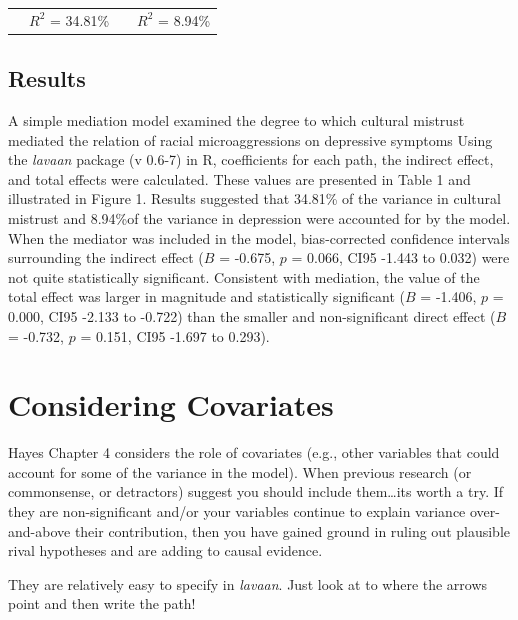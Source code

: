 \documentclass[
  english,
]{book}
\begin{document}
\begin{longtable}[]{@{}lccc@{}}
\toprule
& & & \\
\midrule
\endhead
& \(R^2\) = 34.81\% & & \(R^2\) = 8.94\% \\
\bottomrule
\end{longtable}

\hypertarget{results-3}{%
\subsection{Results}\label{results-3}}

A simple mediation model examined the degree to which cultural mistrust mediated the relation of racial microaggressions on depressive symptoms Using the \emph{lavaan} package (v 0.6-7) in R, coefficients for each path, the indirect effect, and total effects were calculated. These values are presented in Table 1 and illustrated in Figure 1. Results suggested that 34.81\% of the variance in cultural mistrust and 8.94\%of the variance in depression were accounted for by the model. When the mediator was included in the model, bias-corrected confidence intervals surrounding the indirect effect (\(B\) = -0.675, \(p\) = 0.066, CI95 -1.443 to 0.032) were not quite statistically significant. Consistent with mediation, the value of the total effect was larger in magnitude and statistically significant (\(B\) = -1.406, \(p\) = 0.000, CI95 -2.133 to -0.722) than the smaller and non-significant direct effect (\(B\) = -0.732, \(p\) = 0.151, CI95 -1.697 to 0.293).

\hypertarget{considering-covariates}{%
\section{Considering Covariates}\label{considering-covariates}}

Hayes Chapter 4 \citeyearpar{hayes_introduction_2018} considers the role of covariates (e.g., other variables that could account for some of the variance in the model). When previous research (or commonsense, or detractors) suggest you should include them\ldots its worth a try. If they are non-significant and/or your variables continue to explain variance over-and-above their contribution, then you have gained ground in ruling out plausible rival hypotheses and are adding to causal evidence.

They are relatively easy to specify in \emph{lavaan}. Just look at to where the arrows point and then write the path!
\end{document}
